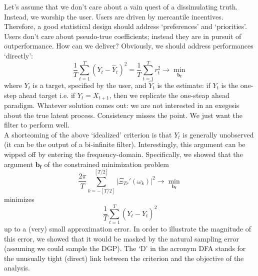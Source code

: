 \documentclass[11pt]{article}
\begin{document}
Let's assume that we don't care about a vain quest of a dissimulating truth. Instead, we worship the user. Users are driven by mercantile incentives. Therefore, a good statistical design should address `preferences' and `priorities'.  Users don't care about pseudo-true coefficients; instead they are in pursuit of outperformance. How can we deliver? Obviously,  we should address performances `directly':
\[\frac{1}{T}\sum_{t=1}^T (Y_t-\hat{Y}_t)^2=\frac{1}{T}\sum_{t=1}^T r_t^2\to\min_{\mathbf{b_f}}\]
where $Y_t$ is a target, specified by the user, and $\hat{Y}_t$ is the estimate: if $Y_t$ is the one-step ahead target i.e. if $Y_t=X_{t+1}$, then we replicate the one-steap ahead paradigm. Whatever solution comes out: we are not interested in an exegesis about the true latent process.  Consistency misses the point. We just want the filter to perform well. \\

A shortcoming of the above `idealized' criterion is that  $Y_t$  is generally unobserved (it can be the output of a bi-infinite filter). Interestingly, this argument  can be wipped off by entering  the frequency-domain. Specifically, we showed that the argument $\mathbf{b_f}$ of the constrained minimization problem
\[\frac{2\pi}{T}\sum_{k=-[T/2]}^{[T/2]}\left|\Xi_{Tr}'(\omega_k)\right|^2\to\min_{\mathbf{b_f}}\]
minimizes 
\[
\frac{1}{T}\sum_{t=1}^T (Y_t-\hat{Y}_t)^2
\]
up to a (very) small approximation error. In order to illustrate the magnitude of this error, we showed that it would be masked  by the natural sampling error (assuming we could sample the DGP). The `D' in the acronym DFA stands for the unusually tight (direct) link between the criterion and the objective of the analysis.  \\
\end{document}
